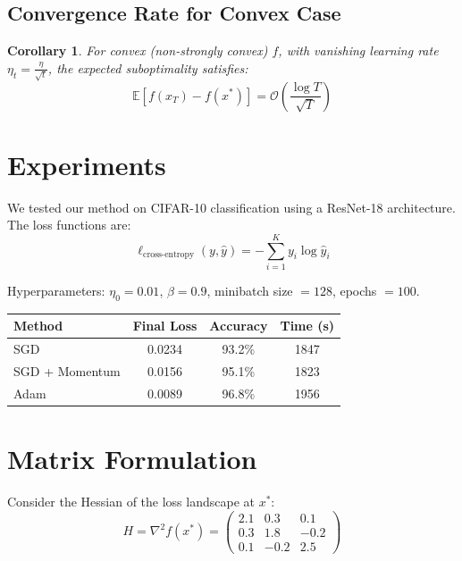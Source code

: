 \documentclass[11pt]{article}
\newtheorem{corollary}[theorem]{Corollary}
\begin{document}
\subsection{Convergence Rate for Convex Case}

\begin{corollary}
For convex (non-strongly convex) $f$, with vanishing learning rate $\eta_t = \frac{\eta}{\sqrt{t}}$,
the expected suboptimality satisfies:
\begin{equation}
\mathbb{E}[f(x_T) - f(x^*)] = \mathcal{O}\left(\frac{\log T}{\sqrt{T}}\right)
\end{equation}
\end{corollary}

\section{Experiments}

We tested our method on CIFAR-10 classification using a ResNet-18 architecture.
The loss functions are:
\begin{equation}
\ell_{\text{cross-entropy}}(y, \hat{y}) = -\sum_{i=1}^{K} y_i \log \hat{y}_i
\end{equation}

Hyperparameters: $\eta_0 = 0.01$, $\beta = 0.9$, minibatch size $= 128$, epochs $= 100$.

\begin{table}[h]
\centering
\begin{tabular}{|l|c|c|c|}
\hline
\textbf{Method} & \textbf{Final Loss} & \textbf{Accuracy} & \textbf{Time (s)} \\
\hline
SGD & 0.0234 & 93.2\% & 1847 \\
SGD + Momentum & 0.0156 & 95.1\% & 1823 \\
Adam & 0.0089 & 96.8\% & 1956 \\
\hline
\end{tabular}
\end{table}

\section{Matrix Formulation}

Consider the Hessian of the loss landscape at $x^*$:
\begin{equation}
H = \nabla^2 f(x^*) = \begin{pmatrix}
2.1 & 0.3 & 0.1 \\
0.3 & 1.8 & -0.2 \\
0.1 & -0.2 & 2.5
\end{pmatrix}
\end{equation}
\end{document}
